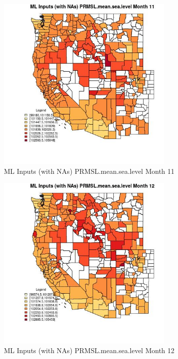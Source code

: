 \begin{figure} 
\centering  
\includegraphics[width=0.77\textwidth]{Code_Outputs/Report_ML_input_PM25_Step4_part_e_de_duplicated_aves_compiled_2019-05-21wNAs_CountyPRMSLmeansealevelmedianMonth11.jpg} 
\caption{\label{fig:Report_ML_input_PM25_Step4_part_e_de_duplicated_aves_compiled_2019-05-21wNAsCountyPRMSLmeansealevelmedianMonth11}ML Inputs (with NAs) PRMSL.mean.sea.level Month 11} 
\end{figure} 
 

\begin{figure} 
\centering  
\includegraphics[width=0.77\textwidth]{Code_Outputs/Report_ML_input_PM25_Step4_part_e_de_duplicated_aves_compiled_2019-05-21wNAs_CountyPRMSLmeansealevelmedianMonth12.jpg} 
\caption{\label{fig:Report_ML_input_PM25_Step4_part_e_de_duplicated_aves_compiled_2019-05-21wNAsCountyPRMSLmeansealevelmedianMonth12}ML Inputs (with NAs) PRMSL.mean.sea.level Month 12} 
\end{figure} 
 

